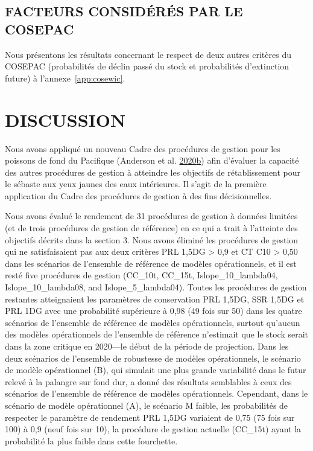 \documentclass[french,11pt]{book}
\begin{document}
\hypertarget{facteurs-considuxe9ruxe9s-par-le-cosepac}{%
\subsection{FACTEURS CONSIDÉRÉS PAR LE COSEPAC}\label{facteurs-considuxe9ruxe9s-par-le-cosepac}}

Nous présentons les résultats concernant le respect de deux autres critères du COSEPAC (probabilités de déclin passé du stock et probabilités d'extinction future) à l'annexe~\ref{app:cosewic}.

\hypertarget{sec:discussion}{%
\section{DISCUSSION}\label{sec:discussion}}

Nous avons appliqué un nouveau Cadre des procédures de gestion pour les poissons de fond du Pacifique (Anderson et al. \protect\hyperlink{ref-anderson2020gfmp}{2020}\protect\hyperlink{ref-anderson2020gfmp}{b}) afin d'évaluer la capacité des autres procédures de gestion à atteindre les objectifs de rétablissement pour le sébaste aux yeux jaunes des eaux intérieures. Il s'agit de la première application du Cadre des procédures de gestion à des fins décisionnelles.

Nous avons évalué le rendement de 31 procédures de gestion à données limitées (et de trois procédures de gestion de référence) en ce qui a trait à l'atteinte des objectifs décrits dans la section 3. Nous avons éliminé les procédures de gestion qui ne satisfaisaient pas aux deux critères PRL 1,5DG \textgreater{} 0,9 et CT C10 \textgreater{} 0,50 dans les scénarios de l'ensemble de référence de modèles opérationnels, et il est resté five procédures de gestion (CC\_10t, CC\_15t, Islope\_10\_lambda04, Islope\_10\_lambda08, and Islope\_5\_lambda04). Toutes les procédures de gestion restantes atteignaient les paramètres de conservation PRL 1,5DG, SSR 1,5DG et PRL 1DG avec une probabilité supérieure à 0,98 (49 fois sur 50) dans les quatre scénarios de l'ensemble de référence de modèles opérationnels, surtout qu'aucun des modèles opérationnels de l'ensemble de référence n'estimait que le stock serait dans la zone critique en 2020---le début de la période de projection. Dans les deux scénarios de l'ensemble de robustesse de modèles opérationnels, le scénario de modèle opérationnel (B), qui simulait une plus grande variabilité dans le futur relevé à la palangre sur fond dur, a donné des résultats semblables à ceux des scénarios de l'ensemble de référence de modèles opérationnels. Cependant, dans le scénario de modèle opérationnel (A), le scénario M faible, les probabilités de respecter le paramètre de rendement PRL 1,5DG variaient de 0,75 (75 fois sur 100) à 0,9 (neuf fois sur 10), la procédure de gestion actuelle (CC\_15t) ayant la probabilité la plus faible dans cette fourchette.
\end{document}
